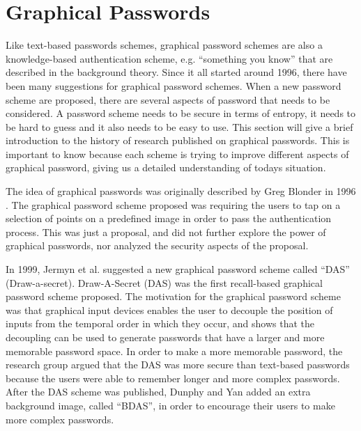 \section{Graphical Passwords}


  Like text-based passwords schemes, graphical password schemes are also a knowledge-based authentication scheme, e.g. ``something you know'' that are described in the background theory. Since it all started around 1996, there have been many suggestions for graphical password schemes. When a new password scheme are proposed, there are several aspects of password that needs to be considered. A password scheme needs to be secure in terms of entropy, it needs to be hard to guess and it also needs to be easy to use. This section will give a brief introduction to the history of research published on graphical passwords. This is important to know because each scheme is trying to improve different aspects of graphical password, giving us a detailed understanding of todays situation. 

  The idea of graphical passwords was originally described by Greg Blonder in 1996 \cite{Blonder}. The graphical password scheme proposed was requiring the users to tap on a selection of points on a predefined image in order to pass the authentication process. This was just a proposal, and did not further explore the power of graphical passwords, nor analyzed the security aspects of the proposal. 

  In 1999, Jermyn et al. \cite{Jermyn} suggested a new graphical password scheme called ``DAS'' (Draw-a-secret). Draw-A-Secret (DAS) was the first recall-based graphical password scheme proposed. The motivation for the graphical password scheme was that graphical input devices enables the user to decouple the position of inputs from the temporal order in which they occur, and shows that the decoupling can be used to generate passwords that have a larger and more memorable password space. In order to make a more memorable password, the research group argued that the DAS was more secure than text-based passwords because the users were able to remember longer and more complex passwords. After the DAS scheme was published, Dunphy and Yan \cite{BDAS} added an extra background image, called ``BDAS'', in order to encourage their users to make more complex passwords.

